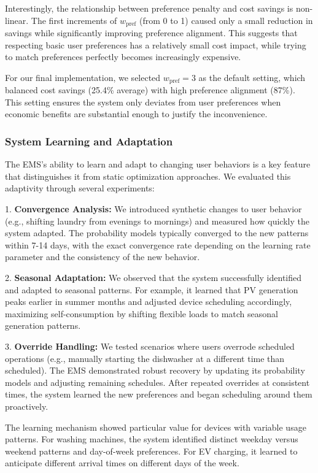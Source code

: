 \documentclass[12pt,a4paper]{article}
\begin{document}
Interestingly, the relationship between preference penalty and cost savings is non-linear. The first increments of $w_{\text{pref}}$ (from 0 to 1) caused only a small reduction in savings while significantly improving preference alignment. This suggests that respecting basic user preferences has a relatively small cost impact, while trying to match preferences perfectly becomes increasingly expensive.

For our final implementation, we selected $w_{\text{pref}}=3$ as the default setting, which balanced cost savings (25.4\% average) with high preference alignment (87\%). This setting ensures the system only deviates from user preferences when economic benefits are substantial enough to justify the inconvenience.

\subsubsection{System Learning and Adaptation}

The EMS's ability to learn and adapt to changing user behaviors is a key feature that distinguishes it from static optimization approaches. We evaluated this adaptivity through several experiments:

1. \textbf{Convergence Analysis:} We introduced synthetic changes to user behavior (e.g., shifting laundry from evenings to mornings) and measured how quickly the system adapted. The probability models typically converged to the new patterns within 7-14 days, with the exact convergence rate depending on the learning rate parameter and the consistency of the new behavior.

2. \textbf{Seasonal Adaptation:} We observed that the system successfully identified and adapted to seasonal patterns. For example, it learned that PV generation peaks earlier in summer months and adjusted device scheduling accordingly, maximizing self-consumption by shifting flexible loads to match seasonal generation patterns.

3. \textbf{Override Handling:} We tested scenarios where users overrode scheduled operations (e.g., manually starting the dishwasher at a different time than scheduled). The EMS demonstrated robust recovery by updating its probability models and adjusting remaining schedules. After repeated overrides at consistent times, the system learned the new preferences and began scheduling around them proactively.

The learning mechanism showed particular value for devices with variable usage patterns. For washing machines, the system identified distinct weekday versus weekend patterns and day-of-week preferences. For EV charging, it learned to anticipate different arrival times on different days of the week.
\end{document}

